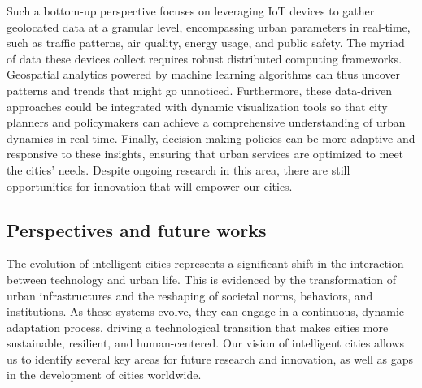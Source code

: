 \documentclass[smartcities,article,submit,pdftex,moreauthors]{Definitions/mdpi}
\begin{document}
Such a bottom-up perspective focuses on leveraging IoT devices to gather geolocated data at a granular level, encompassing urban parameters in real-time, such as traffic patterns, air quality, energy usage, and public safety. The myriad of data these devices collect requires robust distributed computing frameworks. Geospatial analytics powered by machine learning algorithms can thus uncover patterns and trends that might go unnoticed. Furthermore, these data-driven approaches could be integrated with dynamic visualization tools so that city planners and policymakers can achieve a comprehensive understanding of urban dynamics in real-time. Finally, decision-making policies can be more adaptive and responsive to these insights, ensuring that urban services are optimized to meet the cities' needs. Despite ongoing research in this area, there are still opportunities for innovation that will empower our cities.

\subsection{Perspectives and future works}

The evolution of intelligent cities represents a significant shift in the interaction between technology and urban life. This is evidenced by the transformation of urban infrastructures and the reshaping of societal norms, behaviors, and institutions. As these systems evolve, they can engage in a continuous, dynamic adaptation process, driving a technological transition that makes cities more sustainable, resilient, and human-centered. Our vision of intelligent cities allows us to identify several key areas for future research and innovation, as well as gaps in the development of cities worldwide. 
\end{document}
